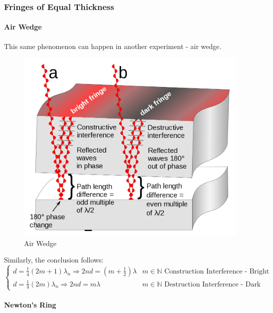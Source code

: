\documentclass[UTF8]{book}
\begin{document}
\subsubsection{Fringes of Equal Thickness}
\paragraph{Air Wedge}
This same phenomenon can happen in another experiment - air wedge. 
\begin{figure}[H]
\centering
\includegraphics[scale=0.16]{Figure/Air_Wedge_1.PNG}
\caption{Air Wedge}
\end{figure}
Similarly, the conclusion follows:
\[\begin{cases}
d = \frac{1}{4}(2m+1)\lambda _n\Rightarrow 2nd=\left(m+\frac{1}{2}\right)\lambda &m\in \mathbb{N} \textrm{ Construction Interference - Bright Fringe}\\
d = \frac{1}{4}(2m)\lambda _n\Rightarrow 2nd=m\lambda &m\in \mathbb{N} \textrm{ Destruction Interference  - Dark Fringe}
\end{cases}\]

\paragraph{Newton's Ring}
\end{document}
